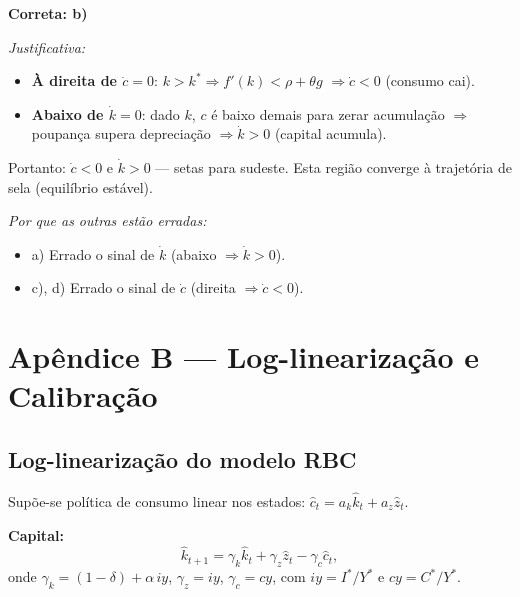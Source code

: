 \documentclass[12pt, a4paper]{article}
\newcommand{\khat}{\hat{k}}
\newcommand{\chat}{\hat{c}}
\newcommand{\zhat}{\hat{z}}
\newcommand{\kstar}{k^*}
\begin{document}
\begin{resultbox}[title={Resposta Q-tipo 4: alternativa b)}]
\textbf{Correta: b)}

\textit{Justificativa:}
\begin{itemize}[leftmargin=1.5em, topsep=2pt, itemsep=2pt]
  \item \textbf{À direita de $\dot{c}=0$}: $k > \kstar \Rightarrow f'(k) < \rho+\theta g$
    $\Rightarrow \dot{c}<0$ (consumo cai).
  \item \textbf{Abaixo de $\dot{k}=0$}: dado $k$, $c$ é baixo demais para zerar acumulação
    $\Rightarrow$ poupança supera depreciação $\Rightarrow \dot{k}>0$ (capital acumula).
\end{itemize}
Portanto: $\dot{c}<0$ e $\dot{k}>0$ --- setas para sudeste. Esta região converge
à trajetória de sela (equilíbrio estável).

\textit{Por que as outras estão erradas:}
\begin{itemize}[leftmargin=1.5em, topsep=2pt, itemsep=2pt]
  \item a) Errado o sinal de $\dot{k}$ (abaixo $\Rightarrow \dot{k}>0$).
  \item c), d) Errado o sinal de $\dot{c}$ (direita $\Rightarrow \dot{c}<0$).
\end{itemize}
\end{resultbox}

\bigskip


\section*{\color{cyanrbc} Apêndice B --- Log-linearização e Calibração}

\subsection*{Log-linearização do modelo RBC}

Supõe-se política de consumo linear nos estados:
$\chat_t = a_k\khat_t + a_z\zhat_t$.

\textbf{Capital:}
\[
\khat_{t+1} = \gamma_k\khat_t + \gamma_z\zhat_t - \gamma_c\chat_t,
\]
onde $\gamma_k=(1-\delta)+\alpha\,iy$, $\gamma_z=iy$, $\gamma_c=cy$,
com $iy=I^*/Y^*$ e $cy=C^*/Y^*$.
\end{document}
